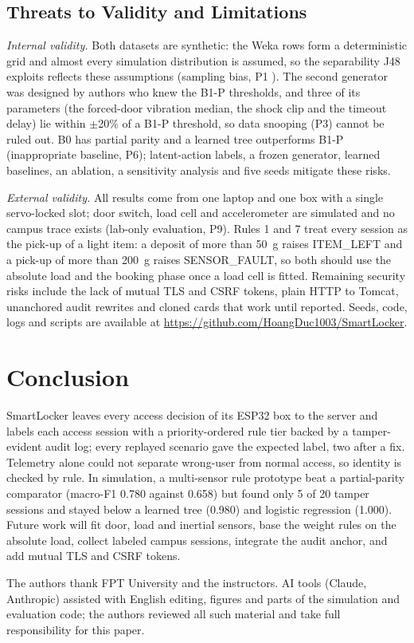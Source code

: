 \documentclass[sigconf,screen]{acmart}
\begin{document}
\subsection{Threats to Validity and Limitations}\label{sec:limits}

\textit{Internal validity.} Both datasets are synthetic: the Weka rows form a deterministic grid and almost every
simulation distribution is assumed, so the separability J48 exploits reflects these assumptions (sampling bias, P1
\cite{arp2022dos}). The second generator was designed by authors who knew the B1-P thresholds, and three of its
parameters (the forced-door vibration median, the shock clip and the timeout delay) lie within $\pm$20\% of a B1-P
threshold, so data snooping (P3) cannot be ruled out. B0 has partial parity and a learned
tree outperforms B1-P (inappropriate baseline, P6); latent-action labels, a frozen generator, learned baselines, an
ablation, a sensitivity analysis and five seeds mitigate these risks.

\textit{External validity.} All results come from one laptop and one box with a single servo-locked slot; door
switch, load cell and accelerometer are simulated and no campus trace exists (lab-only evaluation, P9). Rules 1 and 7
treat every session as the pick-up of a light item: a deposit of more than 50~g raises ITEM\_LEFT and a pick-up of
more than 200~g raises SENSOR\_FAULT, so both should use the absolute load and the booking phase once a load cell is
fitted. Remaining security risks include the lack of mutual TLS and CSRF tokens, plain HTTP to Tomcat, unanchored audit rewrites and cloned cards
that work until reported. Seeds, code, logs and scripts are available at
\url{https://github.com/HoangDuc1003/SmartLocker}.

\section{Conclusion}

SmartLocker leaves every access decision of its ESP32 box to the server and labels each access session with a
priority-ordered rule tier backed by a tamper-evident audit log; every replayed scenario gave the expected label, two
after a fix. Telemetry alone could not separate wrong-user from normal access, so identity is checked by rule. In
simulation, a multi-sensor rule prototype beat a partial-parity comparator (macro-F1 0.780 against 0.658) but found
only 5 of 20 tamper sessions and stayed below a learned tree (0.980) and logistic regression (1.000). Future work will
fit door, load and inertial sensors, base the weight rules on the absolute load, collect labeled campus sessions,
integrate the audit anchor, and add mutual TLS and CSRF tokens.

\begin{acks}
The authors thank FPT University and the instructors. AI tools (Claude, Anthropic) assisted with English editing,
figures and parts of the simulation and evaluation code; the authors reviewed all such material and take full
responsibility for this paper.
\end{acks}



\end{document}
